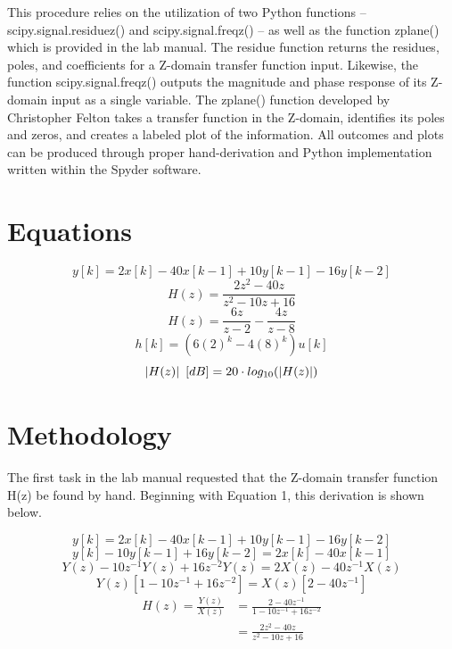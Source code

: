 \documentclass[12pt]{report}
\newcommand{\adjust}{\hspace{0.5em}}
\begin{document}
This procedure relies on the utilization of two Python functions --  scipy.signal.residuez() and scipy.signal.freqz() -- as well as the function zplane() which is provided in the lab manual. The residue function returns the residues, poles, and coefficients for a Z-domain transfer function input. Likewise, the function scipy.signal.freqz() outputs the magnitude and phase response of its Z-domain input as a single variable. The zplane() function developed by Christopher Felton takes a transfer function in the Z-domain, identifies its poles and zeros, and creates a labeled plot of the information. All outcomes and plots can be produced through proper hand-derivation and Python implementation written within the Spyder software. \\

\section{Equations}

\begin{equation}
	y[k] = 2x[k] - 40x[k - 1] + 10y[k - 1] - 16y[k - 2]
\end{equation}
\begin{equation}
	H(z) = \frac{2z^2 - 40z}{z^2 - 10z + 16}
\end{equation}
\begin{equation}
	H(z) = \frac{6z}{z - 2} - \frac{4z}{z - 8}
\end{equation}
\begin{equation}
	h[k] = (6(2)^k - 4(8)^k)u[k]
\end{equation}
\begin{equation}
	|H(z)|\adjust [dB] = 20\cdot log_{10}(|H(z)|)
\end{equation}

\section{Methodology}

The first task in the lab manual requested that the Z-domain transfer function H(z) be found by hand. Beginning with Equation 1, this derivation is shown below.

\begin{equation}
	y[k] = 2x[k] - 40x[k - 1] + 10y[k - 1] - 16y[k - 2]
\end{equation}
\begin{equation*}
	y[k] - 10y[k - 1] + 16y[k - 2] = 2x[k] - 40x[k - 1]
\end{equation*}
\begin{equation*}
	Y(z) - 10z^{-1}Y(z) + 16z^{-2}Y(z) = 2X(z) - 40z^{-1}X(z)
\end{equation*}
\begin{equation*}
	Y(z)[1 - 10z^{-1} + 16z^{-2}] = X(z)[2 - 40z^{-1}]
\end{equation*}
\begin{align}
	H(z) = \frac{Y(z)}{X(z)} &= \frac{2 - 40z^{-1}}{1 - 10z^{-1} + 16z^{-2}} \nonumber \\
	&= \frac{2z^2 - 40z}{z^2 - 10z + 16}
\end{align}
\end{document}
